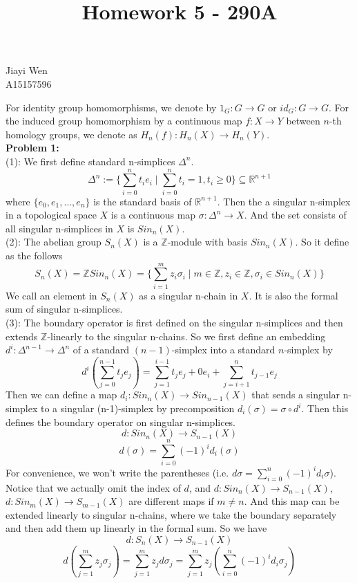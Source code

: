 \documentclass[12pt]{amsart}
\newcommand{\R}{\mathbb{R}}
\newcommand{\Z}{\mathbb{Z}}
\begin{document}
\title{Homework 5 - 290A}
\maketitle
\begin{center}
    Jiayi Wen\\
    A15157596
\end{center}
For identity group homomorphisms, we denote by $1_G:G\to G$ or $id_G:G\to G$. For the induced group homomorphism by a continuous map $f:X\to Y$ between $n$-th homology groups, we denote as $H_n(f):H_n(X)\to H_n(Y)$.\\
\textbf{Problem 1:}\\
(1): We first define standard n-simplices $\Delta^n$.
\[\Delta^n:=\{\sum_{i=0}^nt_ie_i\mid \sum_{i=0}^nt_i=1, t_i\geq 0\}\subseteq \R^{n+1}\]
where $\{e_0,e_1,\dots, e_n\}$ is the standard basis of $\R^{n+1}$. Then the a singular n-simplex in a topological space $X$ is a continuous map $\sigma:\Delta^n\to X$. And the set consists of all singular n-simplices in $X$ is $Sin_n(X)$.\\
(2): The abelian group $S_n(X)$ is a $\Z$-module with basis $Sin_n(X)$. So it define as the follows
\[S_n(X)=\Z Sin_n(X)=\{\sum_{i=1}^mz_i\sigma_i\mid m\in \Z, z_i\in \Z,\sigma_i\in Sin_n(X)\}\]
We call an element in $S_n(X)$ as a singular n-chain in $X$. It is also the formal sum of singular n-simplices.\\
(3): The boundary operator is first defined on the singular n-simplices and then extends $\Z$-linearly to the singular n-chains. So we first define an embedding $d^i:\Delta^{n-1}\to \Delta^n$ of a standard $(n-1)$-simplex into a standard $n$-simplex by
\[d^i(\sum_{j=0}^{n-1}t_je_j)=\sum_{j=1}^{i-1}t_je_j+0e_i+\sum_{j=i+1}^{n}t_{j-1}e_j\]
Then we can define a map $d_i:Sin_n(X)\to Sin_{n-1}(X)$ that sends a singular n-simplex to a singular (n-1)-simplex by precomposition $d_i(\sigma)=\sigma\circ d^i$. Then this defines the boundary operator on singular n-simplices.
\[d:Sin_n(X)\to S_{n-1}(X)\]
\[d(\sigma)=\sum_{i=0}^n(-1)^id_i(\sigma)\]
For convenience, we won't write the parentheses (i.e. $d\sigma=\sum_{i=0}^n(-1)^id_i\sigma$). Notice that we actually omit the index of $d$, and $d:Sin_n(X)\to S_{n-1}(X)$, $d:Sin_m(X)\to S_{m-1}(X)$ are different maps if $m\neq n$.
And this map can be extended linearly to singular n-chains, where we take the boundary separately and then add them up linearly in the formal sum. So we have 
\[d:S_n(X)\to S_{n-1}(X)\]
\[d(\sum_{j=1}^mz_j\sigma_j)=\sum_{j=1}^mz_jd\sigma_j=\sum_{j=1}^mz_j(\sum_{i=0}^n(-1)^id_i\sigma_j)\]
\end{document}
